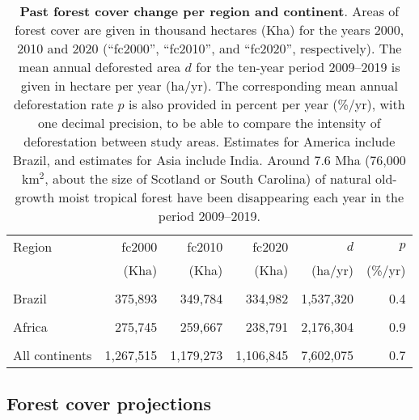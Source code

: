 \documentclass[
  12pt,
]{article}
\begin{document}
\begin{table}[H]

\caption{\label{tab:fcc-hist-reg}\textbf{Past forest cover change per region and continent}. Areas of forest cover are given in thousand hectares (Kha) for the years 2000, 2010 and 2020 (``fc2000'', ``fc2010'', and ``fc2020'', respectively). The mean annual deforested area \(d\) for the ten-year period 2009--2019 is given in hectare per year (ha/yr). The corresponding mean annual deforestation rate \(p\) is also provided in percent per year (\%/yr), with one decimal precision, to be able to compare the intensity of deforestation between study areas. Estimates for America include Brazil, and estimates for Asia include India. Around 7.6 Mha (76,000 km\(^2\), about the size of Scotland or South Carolina) of natural old-growth moist tropical forest have been disappearing each year in the period 2009--2019.\vspace{0.5cm}}
\centering
\fontsize{11}{13}\selectfont
\begin{tabular}[t]{lrrrrr}
\toprule
\multicolumn{1}{l}{Region} & \multicolumn{1}{r}{fc2000} & \multicolumn{1}{r}{fc2010} & \multicolumn{1}{r}{fc2020} & \multicolumn{1}{r}{$d$} & \multicolumn{1}{r}{$p$} \\
 & (Kha) & (Kha) & (Kha) & (ha/yr) & (\%/yr)\\
\midrule
\cellcolor{gray!6}{India} & \cellcolor{gray!6}{11,052} & \cellcolor{gray!6}{9,368} & \cellcolor{gray!6}{8,311} & \cellcolor{gray!6}{121,648} & \cellcolor{gray!6}{1.4}\\
Brazil & 375,893 & 349,784 & 334,982 & 1,537,320 & 0.4\\
\cellcolor{gray!6}{America} & \cellcolor{gray!6}{690,358} & \cellcolor{gray!6}{648,928} & \cellcolor{gray!6}{621,160} & \cellcolor{gray!6}{2,892,786} & \cellcolor{gray!6}{0.5}\\
Africa & 275,745 & 259,667 & 238,791 & 2,176,304 & 0.9\\
\cellcolor{gray!6}{Asia} & \cellcolor{gray!6}{301,412} & \cellcolor{gray!6}{270,679} & \cellcolor{gray!6}{246,894} & \cellcolor{gray!6}{2,532,985} & \cellcolor{gray!6}{1.0}\\
All continents & 1,267,515 & 1,179,273 & 1,106,845 & 7,602,075 & 0.7\\
\bottomrule
\end{tabular}
\end{table}

\newpage

\hypertarget{forest-cover-projections}{%
\subsection{Forest cover projections}\label{forest-cover-projections}}
\end{document}
